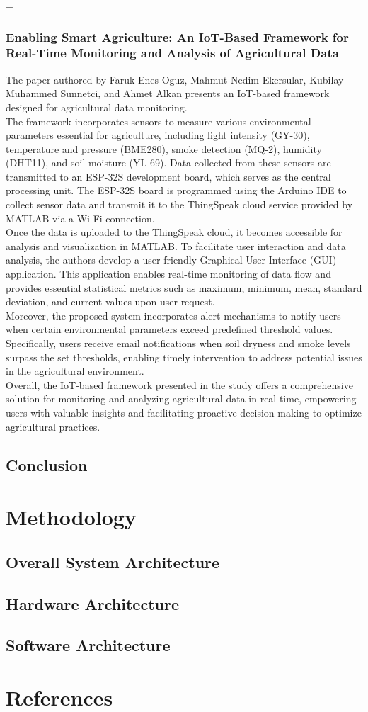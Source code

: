 =\documentclass[12pt, a4paper]{article}
\begin{document}
\subsubsection{Enabling Smart Agriculture: An IoT-Based Framework for Real-Time Monitoring and Analysis of Agricultural Data}
The paper authored by Faruk Enes Oguz, Mahmut Nedim Ekersular, Kubilay Muhammed Sunnetci, and Ahmet Alkan \cite{oguz2024enabling} presents an IoT-based framework designed for agricultural data monitoring.\\
The framework incorporates sensors to measure various environmental parameters essential for agriculture, including light intensity (GY-30), temperature and pressure (BME280), smoke detection (MQ-2), humidity (DHT11), and soil moisture (YL-69). Data collected from these sensors are transmitted to an ESP-32S development board, which serves as the central processing unit. The ESP-32S board is programmed using the Arduino IDE to collect sensor data and transmit it to the ThingSpeak cloud service provided by MATLAB via a Wi-Fi connection.\\
Once the data is uploaded to the ThingSpeak cloud, it becomes accessible for analysis and visualization in MATLAB. To facilitate user interaction and data analysis, the authors develop a user-friendly Graphical User Interface (GUI) application. This application enables real-time monitoring of data flow and provides essential statistical metrics such as maximum, minimum, mean, standard deviation, and current values upon user request.\\
Moreover, the proposed system incorporates alert mechanisms to notify users when certain environmental parameters exceed predefined threshold values. Specifically, users receive email notifications when soil dryness and smoke levels surpass the set thresholds, enabling timely intervention to address potential issues in the agricultural environment.\\
Overall, the IoT-based framework presented in the study offers a comprehensive solution for monitoring and analyzing agricultural data in real-time, empowering users with valuable insights and facilitating proactive decision-making to optimize agricultural practices.

\subsection{Conclusion}
\newpage

\section{Methodology}
\subsection{Overall System Architecture}
\subsection{Hardware Architecture}
\subsection{Software Architecture}
\newpage

\section{References}


\end{document}
